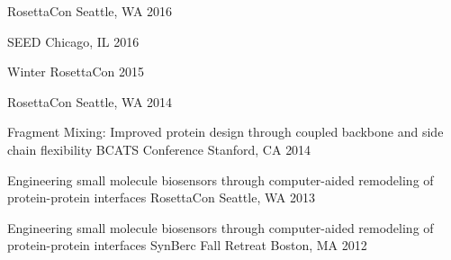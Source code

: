 

\begin{cventries}

  \cventry
  {} %
  {RosettaCon} %
  {Seattle, WA} %
  {2016} %
  {}

  \cventry
  {} %
  {SEED} %
  {Chicago, IL} %
  {2016} %
  {}

  \cventry
  {} %
  {Winter RosettaCon} %
  {} %
  {2015} %
  {}

  \cventry
  {} %
  {RosettaCon} %
  {Seattle, WA} %
  {2014} %
  {}

  \cventry
  {Fragment Mixing: Improved protein design through coupled backbone and side chain flexibility} %
  {BCATS Conference} %
  {Stanford, CA} %
  {2014} %
  {}


  \cventry
  {Engineering small molecule biosensors through computer-aided remodeling of protein-protein interfaces} %
  {RosettaCon} %
  {Seattle, WA} %
  {2013} %
  {}

  \cventry
  {Engineering small molecule biosensors through computer-aided remodeling of protein-protein interfaces} %
  {SynBerc Fall Retreat} %
  {Boston, MA} %
  {2012} %
  {}

\end{cventries}
